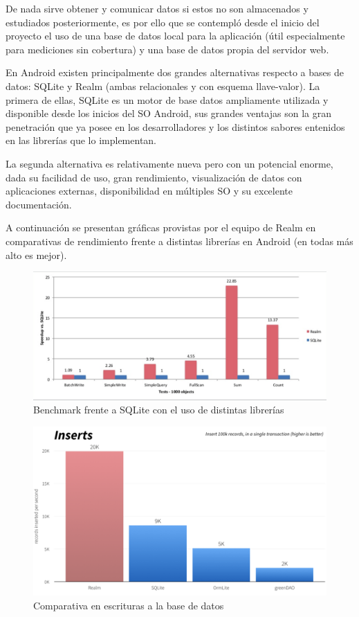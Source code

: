De nada sirve obtener y comunicar datos si estos no son almacenados y estudiados posteriormente, es por ello que se contempló desde el inicio del proyecto el uso de una base de datos local para la aplicación (útil especialmente para mediciones sin cobertura) y una base de datos propia del servidor web.

En Android existen principalmente dos grandes alternativas respecto a bases de datos: SQLite y Realm (ambas relacionales y con esquema llave-valor). La primera de ellas, SQLite es un motor de base datos ampliamente utilizada y disponible desde los inicios del SO Android, sus grandes ventajas son la gran penetración que ya posee en los desarrolladores y los distintos sabores entenidos en las librerías que lo implementan.

La segunda alternativa es relativamente nueva pero con un potencial enorme, dada su facilidad de uso, gran rendimiento, visualización de datos con aplicaciones externas, disponibilidad en múltiples SO y su excelente documentación.

A continuación se presentan gráficas provistas por el equipo de Realm en comparativas de rendimiento \cite{realm_android} frente a distintas librerías en Android (en todas más alto es mejor).

 \begin{figure}[H]
 	\centering
 	\includegraphics[scale=0.3]{figuras/proto2/benchmark.png}
 	\caption{Benchmark frente a SQLite con el uso de distintas librerías \cite{realm_android}}
 	\label{benchmark_realm}
 \end{figure}

\begin{figure}[H]
	\centering
	\includegraphics[scale=0.4]{figuras/proto2/insert.png}
	\caption{Comparativa en escrituras a la base de datos \cite{realm_android}}
	\label{insert}
\end{figure}

